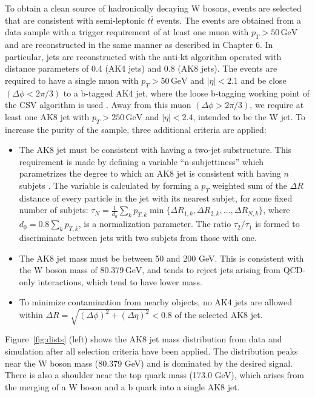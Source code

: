 To obtain a clean source of hadronically decaying W bosons, events are selected that are consistent with semi-leptonic $t\bar{t}$ events. The events are obtained from a data sample with a trigger requirement of at least one muon with $p_{T}>50\,\textrm{GeV}$ and are reconstructed in the same manner as described in Chapter 6.  In particular, jets are reconstructed with the anti-kt algorithm \cite{1126-6708-2008-04-063} operated with distance parameters of 0.4 (AK4 jets) and 0.8 (AK8 jets). The events are required to have a single muon with $p_{T}>50\,\textrm{GeV}$ and $|\eta|<2.1$ and be close $(\Delta\phi < 2\pi/3)$ to a b-tagged AK4 jet, where the loose b-tagging working point of the CSV algorithm is used \cite{BTV-16-002}.  Away from this muon $(\Delta\phi > 2\pi/3)$, we require at least one AK8 jet with $p_{T}>250\,\textrm{GeV}$ and $|\eta|<2.4$, intended to be the W jet. To increase the purity of the sample, three additional criteria are applied:

\begin{itemize}

\item
The AK8 jet must be consistent with having a two-jet substructure. This requirement is made by defining a variable ``n-subjettiness'' which parametrizes the degree to which an AK8 jet is consistent with having $n$ subjets \cite{njet1, njet2}. The variable is calculated by forming a $p_{T}$ weighted sum of the $\Delta R$ distance of every particle in the jet with its nearest subjet, for some fixed number of subjets: $\tau_{N} = \frac{1}{d_{0}} \sum_{k} p_{T, k} \min \{ \Delta R_{1,k}, \Delta R_{2,k}, ..., \Delta R_{N,k} \}$, where $d_{0} = 0.8 \sum_{k} p_{T, k}$, is a normalization parameter. The ratio $\tau_{2}/\tau_{1}$ is formed to discriminate between jets with two subjets from those with one.%

\item
The AK8 jet mass must be between 50 and 200 GeV.  This is consistent with the W boson mass of $80.379\,\textrm{GeV}$, and tends to reject jets arising from QCD-only interactions, which tend to have lower mass.
\item
To minimize contamination from nearby objects, no AK4 jets are allowed within $\Delta R = \sqrt{(\Delta\phi)^2+(\Delta\eta)^2}<0.8$ of the selected AK8 jet.
\end{itemize}

Figure~\ref{fig:dists} (left) shows the AK8 jet mass distribution from data and simulation after all selection criteria have been applied. The distribution peaks near the W boson mass (80.379 GeV) and is dominated by the desired signal.  There is also a shoulder near the top quark mass (173.0 GeV), which arises from the merging of a W boson and a b quark into a single AK8 jet.

